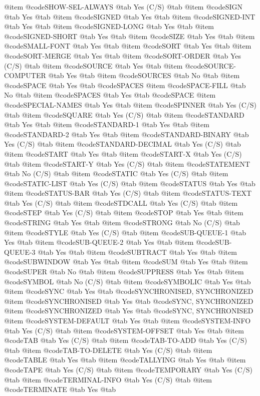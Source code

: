 @item @code{SHOW-SEL-ALWAYS} @tab Yes	(C/S) @tab
@item @code{SIGN} @tab Yes @tab
@item @code{SIGNED} @tab Yes @tab
@item @code{SIGNED-INT} @tab Yes @tab
@item @code{SIGNED-LONG} @tab Yes @tab
@item @code{SIGNED-SHORT} @tab Yes @tab
@item @code{SIZE} @tab Yes @tab
@item @code{SMALL-FONT} @tab Yes @tab
@item @code{SORT} @tab Yes @tab
@item @code{SORT-MERGE} @tab Yes @tab
@item @code{SORT-ORDER} @tab Yes	(C/S) @tab
@item @code{SOURCE} @tab Yes @tab
@item @code{SOURCE-COMPUTER} @tab Yes @tab
@item @code{SOURCES} @tab No @tab
@item @code{SPACE} @tab Yes @tab @code{SPACES}
@item @code{SPACE-FILL} @tab No @tab
@item @code{SPACES} @tab Yes @tab @code{SPACE}
@item @code{SPECIAL-NAMES} @tab Yes @tab
@item @code{SPINNER} @tab Yes	(C/S) @tab
@item @code{SQUARE} @tab Yes	(C/S) @tab
@item @code{STANDARD} @tab Yes @tab
@item @code{STANDARD-1} @tab Yes @tab
@item @code{STANDARD-2} @tab Yes @tab
@item @code{STANDARD-BINARY} @tab Yes	(C/S) @tab
@item @code{STANDARD-DECIMAL} @tab Yes	(C/S) @tab
@item @code{START} @tab Yes @tab
@item @code{START-X} @tab Yes	(C/S) @tab
@item @code{START-Y} @tab Yes	(C/S) @tab
@item @code{STATEMENT} @tab No	(C/S) @tab
@item @code{STATIC} @tab Yes	(C/S) @tab
@item @code{STATIC-LIST} @tab Yes	(C/S) @tab
@item @code{STATUS} @tab Yes @tab
@item @code{STATUS-BAR} @tab Yes	(C/S) @tab
@item @code{STATUS-TEXT} @tab Yes	(C/S) @tab
@item @code{STDCALL} @tab Yes	(C/S) @tab
@item @code{STEP} @tab Yes	(C/S) @tab
@item @code{STOP} @tab Yes @tab
@item @code{STRING} @tab Yes @tab
@item @code{STRONG} @tab No	(C/S) @tab
@item @code{STYLE} @tab Yes	(C/S) @tab
@item @code{SUB-QUEUE-1} @tab Yes @tab
@item @code{SUB-QUEUE-2} @tab Yes @tab
@item @code{SUB-QUEUE-3} @tab Yes @tab
@item @code{SUBTRACT} @tab Yes @tab
@item @code{SUBWINDOW} @tab Yes @tab
@item @code{SUM} @tab Yes @tab
@item @code{SUPER} @tab No @tab
@item @code{SUPPRESS} @tab Yes @tab
@item @code{SYMBOL} @tab No	(C/S) @tab
@item @code{SYMBOLIC} @tab Yes @tab
@item @code{SYNC} @tab Yes @tab @code{SYNCHRONISED, SYNCHRONIZED}
@item @code{SYNCHRONISED} @tab Yes @tab @code{SYNC, SYNCHRONIZED}
@item @code{SYNCHRONIZED} @tab Yes @tab @code{SYNC, SYNCHRONISED}
@item @code{SYSTEM-DEFAULT} @tab Yes @tab
@item @code{SYSTEM-INFO} @tab Yes	(C/S) @tab
@item @code{SYSTEM-OFFSET} @tab Yes @tab
@item @code{TAB} @tab Yes	(C/S) @tab
@item @code{TAB-TO-ADD} @tab Yes	(C/S) @tab
@item @code{TAB-TO-DELETE} @tab Yes	(C/S) @tab
@item @code{TABLE} @tab Yes @tab
@item @code{TALLYING} @tab Yes @tab
@item @code{TAPE} @tab Yes	(C/S) @tab
@item @code{TEMPORARY} @tab Yes	(C/S) @tab
@item @code{TERMINAL-INFO} @tab Yes	(C/S) @tab
@item @code{TERMINATE} @tab Yes @tab
